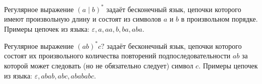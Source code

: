 \begin{example}
    Регулярное выражение $(a\mid b)^*$ задаёт бесконечный язык, цепочки которого имеют произвольную длину и состоят из символов $a$ и $b$ в произвольном порядке.
    Примеры цепочек из языка: $\varepsilon, a, aa, b, ba, aba$.
\end{example}

\begin{example}
    Регулярное выражение $(ab)^*c?$ задаёт бесконечный язык, цепочки которого состоят их произвольного количества повторений подпоследовательности $ab$ за которой может следовать (но не обязательно следует) символ $c$.
    Примеры цепочек из языка: $\varepsilon, abab, abc, abababc$.
\end{example}
